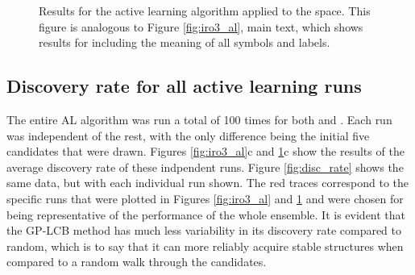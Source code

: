 \begin{figure}[!htb]
\centering
{}
\caption{\label{fig:iro2_al}
%
Results for the active learning algorithm applied to the \IrOtwo space.
%
This figure is analogous to Figure \ref{fig:iro3_al}, main text, which shows results for \IrOthree including the meaning of all symbols and labels.
}
\end{figure}


\subsection{Discovery rate for all active learning runs}
%

%
%
The entire AL algorithm was run a total of \num{100} times for both \IrOtwo and \IrOthree.
%
Each run was independent of the rest, with the only difference being the initial five candidates that were drawn.
%
Figures \ref{fig:iro3_al}c and \ref{fig:iro2_al}c show the results of the average discovery rate of these indpendent runs.
%
Figure \ref{fig:disc_rate} shows the same data, but with each individual run shown.
%
The red traces correspond to the specific runs that were plotted in Figures \ref{fig:iro3_al} and \ref{fig:iro2_al} and were chosen for being representative of the performance of the whole ensemble.
%
It is evident that the GP-LCB method has much less variability in its discovery rate compared to random, which is to say that it can more reliably acquire stable structures when compared to a random walk through the candidates.

